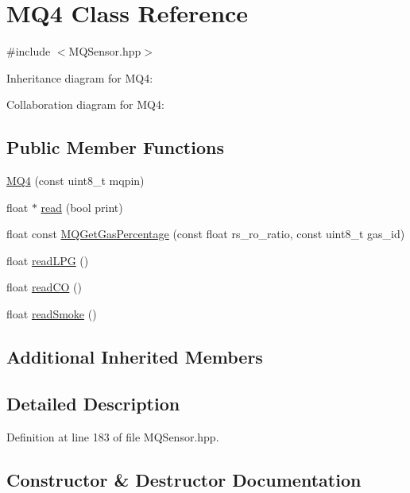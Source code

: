 \hypertarget{class_m_q4}{}\section{M\+Q4 Class Reference}
\label{class_m_q4}


{\ttfamily \#include $<$M\+Q\+Sensor.\+hpp$>$}



Inheritance diagram for M\+Q4\+:


Collaboration diagram for M\+Q4\+:
\subsection*{Public Member Functions}
\begin{DoxyCompactItemize}
\item 
\hyperlink{class_m_q4_adfe1eadd2867a8a69384f2a553df101c}{M\+Q4} (const uint8\+\_\+t mqpin)
\item 
float $\ast$ \hyperlink{class_m_q4_aff76f2bd82f01f60084edb9428cab21f}{read} (bool print)
\item 
float const \hyperlink{class_m_q4_a6ee7197454cdc8ff64405c77631c744e}{M\+Q\+Get\+Gas\+Percentage} (const float rs\+\_\+ro\+\_\+ratio, const uint8\+\_\+t gas\+\_\+id)
\item 
float \hyperlink{class_m_q4_a2b17d7b7d55b4d52296aa0668df8c926}{read\+L\+PG} ()
\item 
float \hyperlink{class_m_q4_ac8a23ef7e4bb8ce6559e6884e15203ff}{read\+CO} ()
\item 
float \hyperlink{class_m_q4_a4f9c1c3ea972b8e65dd19fd80b33c3e3}{read\+Smoke} ()
\end{DoxyCompactItemize}
\subsection*{Additional Inherited Members}


\subsection{Detailed Description}


Definition at line 183 of file M\+Q\+Sensor.\+hpp.



\subsection{Constructor \& Destructor Documentation}

